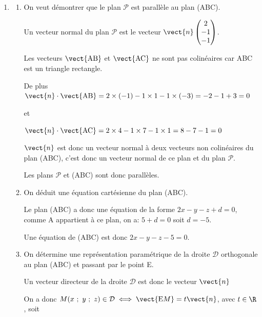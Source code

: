 \begin{enumerate}
\begin{enumerate}
La calculatrice donne $\widehat{\text{ABC}} \approx 68\degres$ au degré près.
	\end{enumerate}
	
\item
	\begin{enumerate}
		\item On veut démontrer que le plan $\mathcal{P}$ est parallèle au plan (ABC).

Un vecteur normal du plan $\mathscr{P}$ est le vecteur $\vect{n}\begin{pmatrix}2\\-1\\-1\end{pmatrix}$.

Les vecteurs $\vect{\text{AB}}$ et $\vect{\text{AC}}$ ne sont pas colinéaires car ABC est un triangle rectangle.

De plus $\vect{n} \cdot \vect{\text{AB}}=2\times (-1) -1\times 1 - 1\times (-3) =-2-1+3 = 0$

et

$\vect{n} \cdot \vect{\text{AC}}=2\times 4-1\times 7-1\times 1 = 8 - 7 - 1 = 0$

$\vect{n}$ est donc un vecteur normal à deux vecteurs non colinéaires du plan (ABC), c'est donc un vecteur normal de ce plan et du plan $\mathscr{P}$.

Les plans $\mathscr{P}$ et (ABC) sont donc parallèles.

		\item On déduit une équation cartésienne du plan (ABC).

Le plan (ABC) a donc une équation de la forme $2x - y - z + d = 0$, comme A appartient à ce plan,  on a: $5 + d = 0$ soit $d = -5$.
		
Une équation de (ABC) est donc $2x - y - z - 5 = 0$.

		\item On détermine une représentation paramétrique de la droite $\mathcal{D}$ orthogonale au plan (ABC) et passant par le point E.
		
Un vecteur directeur de la droite $\mathcal{D}$ est donc le vecteur $\vect{n}$ 
		
On a donc $M(x~;~y~;~z) \in \mathcal{D} \iff \vect{\text{E}M} = t \vect{n}$, avec $t \in \R$, soit


\end{enumerate}
\end{enumerate}
